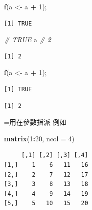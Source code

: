 \documentclass[]{book}
\newenvironment{Shaded}{\begin{snugshade}}{\end{snugshade}}
\newcommand{\CommentTok}[1]{\textcolor[rgb]{0.56,0.35,0.01}{\textit{#1}}}
\newcommand{\DataTypeTok}[1]{\textcolor[rgb]{0.13,0.29,0.53}{#1}}
\newcommand{\DecValTok}[1]{\textcolor[rgb]{0.00,0.00,0.81}{#1}}
\newcommand{\KeywordTok}[1]{\textcolor[rgb]{0.13,0.29,0.53}{\textbf{#1}}}
\newcommand{\NormalTok}[1]{#1}
\newcommand{\OperatorTok}[1]{\textcolor[rgb]{0.81,0.36,0.00}{\textbf{#1}}}
\newcommand{\StringTok}[1]{\textcolor[rgb]{0.31,0.60,0.02}{#1}}
\theoremstyle{definition}
\theoremstyle{definition}
\theoremstyle{definition}
\theoremstyle{remark}
\begin{document}
\begin{Shaded}
\begin{Highlighting}[]
\KeywordTok{f}\NormalTok{(a <-}\StringTok{ }\NormalTok{a }\OperatorTok{+}\StringTok{ }\DecValTok{1}\NormalTok{);}
\end{Highlighting}
\end{Shaded}

\begin{verbatim}
[1] TRUE
\end{verbatim}

\begin{Shaded}
\begin{Highlighting}[]
\CommentTok{# TRUE}
\NormalTok{a }\CommentTok{# 2}
\end{Highlighting}
\end{Shaded}

\begin{verbatim}
[1] 2
\end{verbatim}

\begin{Shaded}
\begin{Highlighting}[]
\KeywordTok{f}\NormalTok{(a <-}\StringTok{ }\NormalTok{a }\OperatorTok{+}\StringTok{ }\DecValTok{1}\NormalTok{);}
\end{Highlighting}
\end{Shaded}

\begin{verbatim}
[1] TRUE
\end{verbatim}

\begin{Shaded}
\end{Shaded}

\begin{verbatim}
[1] 2
\end{verbatim}

=用在參數指派 例如

\begin{Shaded}
\begin{Highlighting}[]
\KeywordTok{matrix}\NormalTok{(}\DecValTok{1}\OperatorTok{:}\DecValTok{20}\NormalTok{, }\DataTypeTok{ncol =} \DecValTok{4}\NormalTok{)}
\end{Highlighting}
\end{Shaded}

\begin{verbatim}
     [,1] [,2] [,3] [,4]
[1,]    1    6   11   16
[2,]    2    7   12   17
[3,]    3    8   13   18
[4,]    4    9   14   19
[5,]    5   10   15   20
\end{verbatim}
\end{document}

